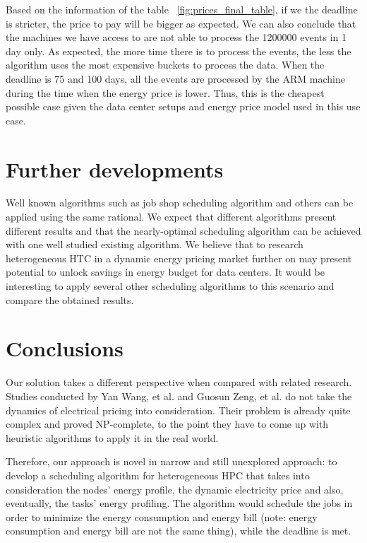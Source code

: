 Based on the information of the table ~\ref{fig:prices_final_table}, if we the deadline is stricter, the price to pay will be bigger as expected. We can also conclude that the machines we have access to are not able to process the 1200000 events in 1 day only. As expected, the more time there is to process the events, the less the algorithm uses the most expensive buckets to process the data. When the deadline is 75 and 100 days, all the events are processed by the ARM machine during the time when the energy price is lower. Thus, this is the cheapest possible case given the data center setups and energy price model used in this use case.



\section{Further developments}

Well known algorithms such as job shop scheduling algorithm and others can be applied using the same rational. We expect that different algorithms present different results and that the nearly-optimal scheduling algorithm can be achieved with one well studied existing algorithm. We believe that to research heterogeneous HTC in a dynamic energy pricing market further on may present potential to unlock savings in energy budget for data centers. It would be interesting to apply several other scheduling algorithms to this scenario and compare the obtained results.

\section{Conclusions}

Our solution takes a different perspective when compared with related research. Studies conducted by Yan Wang, et al.  \cite{TASK_SCHED} and Guosun Zeng, et al. \cite{EXE_METHOD} do not take the
dynamics of electrical pricing into consideration. Their problem is
already quite complex and proved NP-complete, to the point they have to come up
with heuristic algorithms to apply it in the real world.

Therefore, our approach is novel in narrow and still
unexplored approach: to develop a scheduling algorithm for heterogeneous HPC that
takes into consideration the nodes' energy profile, the dynamic electricity
price and also, eventually, the tasks' energy profiling. The algorithm would
schedule the jobs in order to minimize the energy consumption and energy bill
(note: energy consumption and energy bill are not the same thing), while the
deadline is met. 

